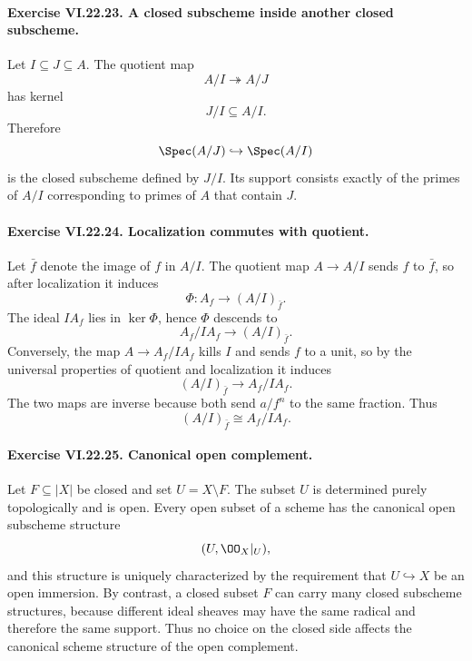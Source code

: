 \paragraph{Exercise VI.22.23. A closed subscheme inside another closed subscheme.}
\begin{solution}
Let $I\subseteq J\subseteq A$.  The quotient map
\[
 A/I\twoheadrightarrow A/J
\]
has kernel
\[
 J/I\subseteq A/I.
\]
Therefore
\[
 \Spec(A/J)\hookrightarrow\Spec(A/I)
\]
is the closed subscheme defined by $J/I$.  Its support consists exactly of the primes
of $A/I$ corresponding to primes of $A$ that contain $J$.
\end{solution}

\paragraph{Exercise VI.22.24. Localization commutes with quotient.}
\begin{solution}
Let $\bar f$ denote the image of $f$ in $A/I$.  The quotient map $A\to A/I$ sends $f$ to
$\bar f$, so after localization it induces
\[
 \Phi:A_f\longrightarrow(A/I)_{\bar f}.
\]
The ideal $IA_f$ lies in $\ker\Phi$, hence $\Phi$ descends to
\[
 A_f/IA_f\longrightarrow(A/I)_{\bar f}.
\]
Conversely, the map $A\to A_f/IA_f$ kills $I$ and sends $f$ to a unit, so by the universal
properties of quotient and localization it induces
\[
 (A/I)_{\bar f}\longrightarrow A_f/IA_f.
\]
The two maps are inverse because both send $a/f^n$ to the same fraction.  Thus
\[
 (A/I)_{\bar f}\cong A_f/IA_f.
\]
\end{solution}

\paragraph{Exercise VI.22.25. Canonical open complement.}
\begin{solution}
Let $F\subseteq|X|$ be closed and set $U=X\setminus F$.  The subset $U$ is determined purely
topologically and is open.  Every open subset of a scheme has the canonical open subscheme
structure
\[
 (U,\OO_X|_U),
\]
and this structure is uniquely characterized by the requirement that $U\hookrightarrow X$ be
an open immersion.  By contrast, a closed subset $F$ can carry many closed subscheme structures,
because different ideal sheaves may have the same radical and therefore the same support.
Thus no choice on the closed side affects the canonical scheme structure of the open complement.
\end{solution}

